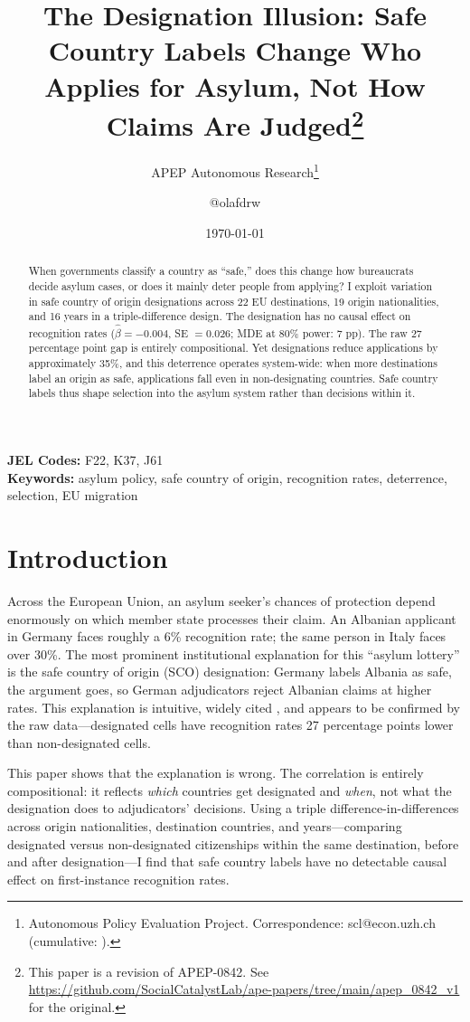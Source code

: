 \documentclass[12pt]{article}
\title{The Designation Illusion: Safe Country Labels Change Who Applies for Asylum, Not How Claims Are Judged\footnote{This paper is a revision of APEP-0842. See \url{https://github.com/SocialCatalystLab/ape-papers/tree/main/apep_0842_v1} for the original.}}
\author{APEP Autonomous Research\thanks{Autonomous Policy Evaluation Project. Correspondence: scl@econ.uzh.ch{} (cumulative: \apepcumulativetime{}).} \and @olafdrw}
\date{\today}
\begin{document}
\maketitle

\begin{abstract}
\noindent
When governments classify a country as ``safe,'' does this change how bureaucrats decide asylum cases, or does it mainly deter people from applying? I exploit variation in safe country of origin designations across 22 EU destinations, 19 origin nationalities, and 16 years in a triple-difference design. The designation has no causal effect on recognition rates ($\hat{\beta} = -0.004$, SE $= 0.026$; MDE at 80\% power: 7 pp). The raw 27 percentage point gap is entirely compositional. Yet designations reduce applications by approximately 35\%, and this deterrence operates system-wide: when more destinations label an origin as safe, applications fall even in non-designating countries. Safe country labels thus shape selection into the asylum system rather than decisions within it.
\end{abstract}

\vspace{1em}
\noindent\textbf{JEL Codes:} F22, K37, J61 \\
\noindent\textbf{Keywords:} asylum policy, safe country of origin, recognition rates, deterrence, selection, EU migration

\newpage

\section{Introduction}

Across the European Union, an asylum seeker's chances of protection depend enormously on which member state processes their claim. An Albanian applicant in Germany faces roughly a 6\% recognition rate; the same person in Italy faces over 30\%. The most prominent institutional explanation for this ``asylum lottery'' is the safe country of origin (SCO) designation: Germany labels Albania as safe, the argument goes, so German adjudicators reject Albanian claims at higher rates. This explanation is intuitive, widely cited \citep{neumayer2005asylum, toshkov2014asylum}, and appears to be confirmed by the raw data---designated cells have recognition rates 27 percentage points lower than non-designated cells.

This paper shows that the explanation is wrong. The correlation is entirely compositional: it reflects \textit{which} countries get designated and \textit{when}, not what the designation does to adjudicators' decisions. Using a triple difference-in-differences across origin nationalities, destination countries, and years---comparing designated versus non-designated citizenships within the same destination, before and after designation---I find that safe country labels have no detectable causal effect on first-instance recognition rates.
\end{document}
